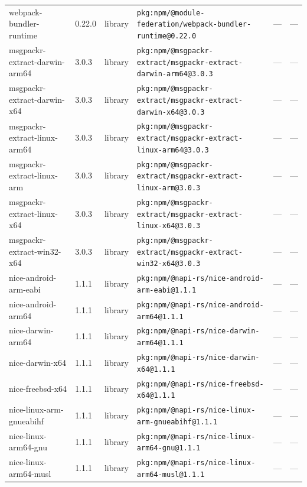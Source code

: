 \documentclass[11pt,a4paper]{article}
\begin{document}
\begin{longtable}{|p{4cm}|p{2cm}|p{1.6cm}|p{5cm}|p{1.5cm}|p{3.5cm}|}
\raggedright webpack-bundler-runtime & 0.22.0 & library & \small\texttt{pkg:npm/@module-federation/webpack-bundler-runtime@0.22.0} & — & \small — \\
\raggedright msgpackr-extract-darwin-arm64 & 3.0.3 & library & \small\texttt{pkg:npm/@msgpackr-extract/msgpackr-extract-darwin-arm64@3.0.3} & — & \small — \\
\raggedright msgpackr-extract-darwin-x64 & 3.0.3 & library & \small\texttt{pkg:npm/@msgpackr-extract/msgpackr-extract-darwin-x64@3.0.3} & — & \small — \\
\raggedright msgpackr-extract-linux-arm64 & 3.0.3 & library & \small\texttt{pkg:npm/@msgpackr-extract/msgpackr-extract-linux-arm64@3.0.3} & — & \small — \\
\raggedright msgpackr-extract-linux-arm & 3.0.3 & library & \small\texttt{pkg:npm/@msgpackr-extract/msgpackr-extract-linux-arm@3.0.3} & — & \small — \\
\raggedright msgpackr-extract-linux-x64 & 3.0.3 & library & \small\texttt{pkg:npm/@msgpackr-extract/msgpackr-extract-linux-x64@3.0.3} & — & \small — \\
\raggedright msgpackr-extract-win32-x64 & 3.0.3 & library & \small\texttt{pkg:npm/@msgpackr-extract/msgpackr-extract-win32-x64@3.0.3} & — & \small — \\
\raggedright nice-android-arm-eabi & 1.1.1 & library & \small\texttt{pkg:npm/@napi-rs/nice-android-arm-eabi@1.1.1} & — & \small — \\
\raggedright nice-android-arm64 & 1.1.1 & library & \small\texttt{pkg:npm/@napi-rs/nice-android-arm64@1.1.1} & — & \small — \\
\raggedright nice-darwin-arm64 & 1.1.1 & library & \small\texttt{pkg:npm/@napi-rs/nice-darwin-arm64@1.1.1} & — & \small — \\
\raggedright nice-darwin-x64 & 1.1.1 & library & \small\texttt{pkg:npm/@napi-rs/nice-darwin-x64@1.1.1} & — & \small — \\
\raggedright nice-freebsd-x64 & 1.1.1 & library & \small\texttt{pkg:npm/@napi-rs/nice-freebsd-x64@1.1.1} & — & \small — \\
\raggedright nice-linux-arm-gnueabihf & 1.1.1 & library & \small\texttt{pkg:npm/@napi-rs/nice-linux-arm-gnueabihf@1.1.1} & — & \small — \\
\raggedright nice-linux-arm64-gnu & 1.1.1 & library & \small\texttt{pkg:npm/@napi-rs/nice-linux-arm64-gnu@1.1.1} & — & \small — \\
\raggedright nice-linux-arm64-musl & 1.1.1 & library & \small\texttt{pkg:npm/@napi-rs/nice-linux-arm64-musl@1.1.1} & — & \small — \\

\end{longtable}
\end{document}
